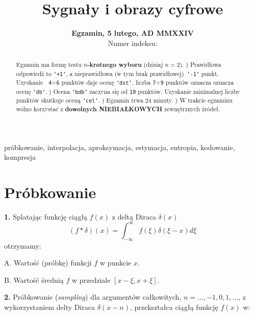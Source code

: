 \documentclass[journal,9pt,final,a4paper]{IEEEtran}%
\begin{document}
\title{Sygnały i obrazy cyfrowe}
\author{\textbf{Egzamin, 5 lutego, AD MMXXIV}\vspace*{5mm}\\Numer indeksu:
\begin{tabular}
[c]{|l|l|l|l|l|l|}\hline
&  &  &  &  & \\\hline
\end{tabular}
}
\maketitle

\begin{abstract}
Egzamin ma formę testu $n$\textbf{-krotnego wyboru} (dzisiaj $n=2$).
) Prawidłowa odpowiedź to \texttt{'+1'}, a nieprawidłowa (w
tym brak prawidłowej)\ \texttt{'-1'} punkt. Uzyskanie\textbf{\ }%
\texttt{4}$\mathbf{\div}$\texttt{6} punktów daje ocenę \texttt{'dst'},
liczba \texttt{7}$\mathbf{\div}$\texttt{9} punktów oznacza oznacza
ocenę \texttt{'db'}. ) Ocena \texttt{'bdb'} zaczyna się od
\texttt{10} punktów. Uzyskanie minimalnej liczby punktów skutkuje
oceną \texttt{'cel'}. ) Egzamin trwa 24 minuty. ) W
trakcie egzaminu wolno korzystać z \textbf{dowolnych NIEBIAŁKOWYCH}
zewnętrznych źródeł.

\end{abstract}

\begin{IEEEkeywords}
próbkowanie, interpolacja, aproksymacja, estymacja, entropia, kodowanie, kompresja
\end{IEEEkeywords}

\section{Próbkowanie}

\textbf{1. }Splatając funkcję ciągłą $f\left(  x\right)  $ z
deltą Diraca $\delta\left(  x\right)  $%
\[
\left(  f\ast\delta\right)  \left(  x\right)  =\int_{-\infty}^{\infty}f\left(
\xi\right)  \delta\left(  \xi-x\right)  d\xi
\]
otrzymamy:

A. Wartość (próbkę) funkcji $f$ w punkcie $x$.

B. Wartość średnią $f$ w przedziale $\left[  x-\xi
,x+\xi\right]  $.

\vspace*{0.25in}\textbf{2. }Próbkowanie (\emph{sampling}) dla
argumentów całkowitych, $n=\ldots,-1,0,1,\ldots$, z wykorzystaniem delty
Diraca $\delta\left(  x-n\right)  $, przekształca ciągłą
funkcję $f\left(  x\right)  $ w:
\end{document}
